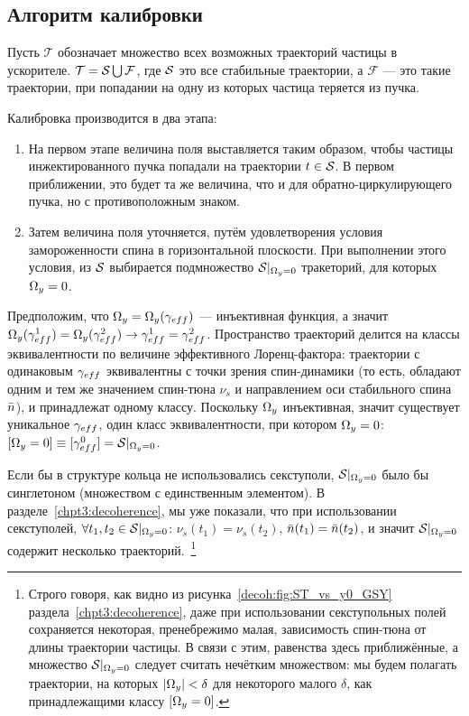
\newcommand{\Traj}{\mathcal T}
\newcommand{\Fail}{\mathcal F}
\newcommand{\CO}{\mathrm{CO}}
\renewcommand{\D}{\mathcal D}

\subsection{Алгоритм калибровки}
Пусть $\Traj$ обозначает множество всех возможных траекторий частицы в ускорителе. $\Traj = \Stab \bigcup \Fail$,
где $\Stab$ это все стабильные траектории, а $\Fail$ --- это такие траектории,
при попадании на одну из которых частица теряется из пучка.

Калибровка производится в два этапа:
\begin{enumerate}
\item На первом этапе величина поля выставляется таким образом, чтобы частицы инжектированного пучка
попадали на траектории $t\in \Stab$. В первом приближении, это будет та же величина,
что и для обратно-циркулирующего пучка, но с противоположным знаком.
\item Затем величина поля уточняется, путём удовлетворения условия замороженности спина в горизонтальной
плоскости. При выполнении этого условия, из $\Stab$ выбирается подмножество $\Stab*$ тракеторий, для которых
$\Omega_y = 0$.
\end{enumerate}

Предположим, что $\W_y = \W_y(\g*)$ --- инъективная функция, а значит
$\W_y(\g*^1) = \W_y(\g*^2) \rightarrow \g*^1 = \g*^2$. Пространство траекторий делится на
классы эквивалентности по величине эффективного Лоренц-фактора: траектории с одинаковым $\g*$ эквивалентны
с точки зрения спин-динамики (то есть, обладают одним и тем же значением спин-тюна $\nu_s$ и направлением
оси стабильного спина $\bar n$), и принадлежат одному классу. Поскольку $\Omega_y$ инъективная, значит существует
уникальное $\g*$, один класс эквивалентности, при котором $\Omega_y=0$: $[\W_y=0]\equiv [\g*^0] = \Stab*$.

Если бы в структуре кольца не использовались секступоли, $\Stab*$ было бы синглетоном (множеством с
единственным элементом). В разделе~\ref{chpt3:decoherence}, мы уже показали, что
при использовании секступолей, $\forall t_1,t_2\in\Stab*$:
$\nu_s(t_1) = \nu_s(t_2)$, $\bar n(t_1) = \bar n(t_2)$, и значит $\Stab*$ содержит
несколько траекторий.~\footnote{Строго говоря, как видно из рисунка~\ref{decoh:fig:ST_vs_y0_GSY}
раздела~\ref{chpt3:decoherence}, даже при использовании секступольных полей сохраняется некоторая,
пренебрежимо малая, зависимость спин-тюна от длины траектории частицы. В связи с этим, равенства
здесь приближённые, а множество $\Stab*$ следует считать нечётким множеством: мы будем полагать траектории,
на которых $|\Omega_y| < \delta$ для некоторого малого $\delta$, как принадлежащими классу $[\Omega_y=0]$.}

